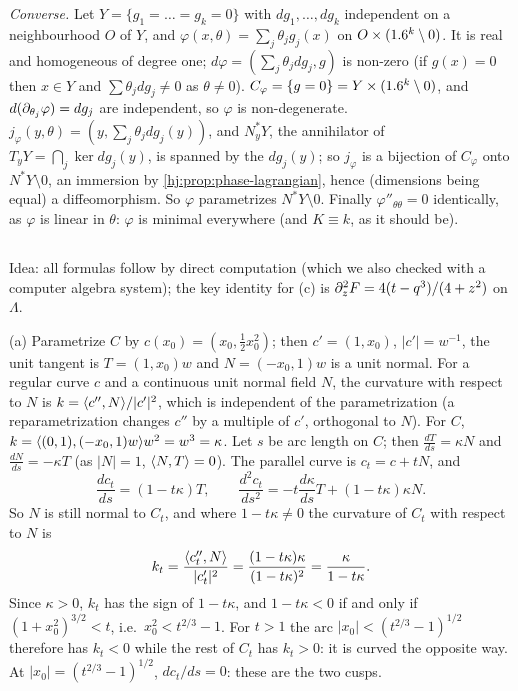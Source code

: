 \emph{Converse.} Let $Y=\{g_1=\dots=g_k=0\}$ with $dg_1,\dots,dg_k$ independent on a
neighbourhood $O$ of $Y$, and $\varphi(x,\theta)=\sum_j\theta_jg_j(x)$ on $O\times(1.6^k\setminus
0)$. It is real and homogeneous of degree one; $d\varphi=(\sum_j\theta_jdg_j,g)$ is non-zero
(if $g(x)=0$ then $x\in Y$ and $\sum\theta_jdg_j\ne0$ as $\theta\ne0$). $C_\varphi=\{g=0\}=
Y\times(1.6^k\setminus0)$, and $d(\partial_{\theta_j}\varphi)=dg_j$ are independent, so $\varphi$ is
non-degenerate. $j_\varphi(y,\theta)=(y,\sum_j\theta_jdg_j(y))$, and $N^*_yY$, the annihilator
of $T_yY=\bigcap_j\ker dg_j(y)$, is spanned by the $dg_j(y)$; so $j_\varphi$ is a bijection of
$C_\varphi$ onto $N^*Y\setminus0$, an immersion by \cref{hj:prop:phase-lagrangian}, hence
(dimensions being equal) a diffeomorphism. So $\varphi$ parametrizes $N^*Y\setminus0$.
Finally $\varphi''_{\theta\theta}=0$ identically, as $\varphi$ is linear in $\theta$: $\varphi$
is minimal everywhere (and $K\equiv k$, as it should be).

\subsection*{}
Idea: all formulas follow by direct computation (which we also checked with a computer algebra
system); the key identity for (c) is $\partial_z^2F=4(t-q^3)/(4+z^2)$ on $\Lambda$.

(a) Parametrize $C$ by $c(x_0)=(x_0,\frac12x_0^2)$; then $c'=(1,x_0)$, $|c'|=w^{-1}$, the unit
tangent is $T=(1,x_0)w$ and $N=(-x_0,1)w$ is a unit normal. For a regular curve $c$ and a
continuous unit normal field $N$, the curvature with respect to $N$ is $k=\langle c'',N\rangle/|c'|^2$,
which is independent of the parametrization (a reparametrization changes $c''$ by a multiple of
$c'$, orthogonal to $N$). For $C$, $k=\langle (0,1),(-x_0,1)w\rangle w^2=w^3=\kappa$. Let $s$ be arc length
on $C$; then $\frac{dT}{ds}=\kappa N$ and $\frac{dN}{ds}=-\kappa T$ (as $|N|=1$, $\langle N,T\rangle=0$).
The parallel curve is $c_t=c+tN$, and
\begin{equation*}
\frac{dc_t}{ds}=(1-t\kappa)T,\qquad\frac{d^2c_t}{ds^2}=-t\frac{d\kappa}{ds}T+(1-t\kappa)\kappa N .
\end{equation*}
So $N$ is still normal to $C_t$, and where $1-t\kappa\ne0$ the curvature of $C_t$ with
respect to $N$ is
\begin{equation*}
k_t=\frac{\langle c_t'',N\rangle}{|c_t'|^2}=\frac{(1-t\kappa)\kappa}{(1-t\kappa)^2}=\frac\kappa
{1-t\kappa}.
\end{equation*}
Since $\kappa>0$, $k_t$ has the sign of $1-t\kappa$, and $1-t\kappa<0$ if and only if
$(1+x_0^2)^{3/2}<t$, i.e.\ $x_0^2<t^{2/3}-1$. For $t>1$ the arc $|x_0|<(t^{2/3}-1)^{1/2}$
therefore has $k_t<0$ while the rest of $C_t$ has $k_t>0$: it is curved the opposite way. At
$|x_0|=(t^{2/3}-1)^{1/2}$, $dc_t/ds=0$: these are the two cusps.

